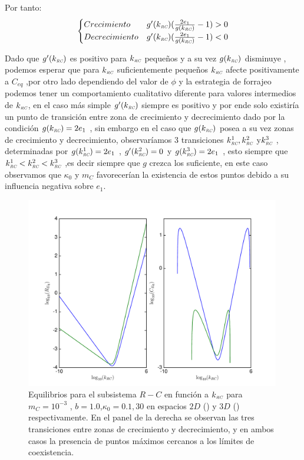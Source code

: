 Por tanto:
\begin{equation}
  \begin{cases}
    Crecimiento &  g'(k_{\textit{\tiny RC}}) ( \frac{2e_1}{g(k_{\textit{\tiny RC}})} - 1) > 0 \\
    Decrecimiento &  g'(k_{\textit{\tiny RC}}) ( \frac{2e_1}{g(k_{\textit{\tiny RC}})} - 1) < 0
    \end{cases}
\end{equation}

Dado que $g'(k_{\textit{\tiny RC}})$ es positivo para $k_\RC$ peque\~nos y a su vez $g(k_{\textit{\tiny RC}})$ disminuye , podemos esperar que para $k_\RC$ suficientemente peque\~nos $k_\RC$ afecte positivamente a $C_{eq}$ ,por otro lado dependiendo del valor de $\phi$ y la estrategia de forrajeo podemos tener un comportamiento cualitativo diferente para valores intermedios de $k_\RC$, en el caso m\'as simple $g'(k_{\textit{\tiny RC}})$ siempre es positivo y por ende solo existir\'ia un punto de transici\'on entre zona de crecimiento y decrecimiento dado por la condici\'on $g(k_{\textit{\tiny RC}}) = 2e_1$ , sin embargo en el caso que $g(k_{\textit{\tiny RC}})$ posea a su vez zonas de crecimiento y decrecimiento, observar\'iamos 3 transiciones $k_{\textit{\tiny RC}}^1 , k_{\textit{\tiny RC}}^2$ y$k_{\textit{\tiny RC}}^3$ , determinadas por $g(k_{\textit{\tiny RC}}^1) = 2e_1$ , $g'(k_{\textit{\tiny RC}}^2) =0$ y $g(k_{\textit{\tiny RC}}^3) = 2e_1$ , esto siempre que $k_{\textit{\tiny RC}}^1 < k_{\textit{\tiny RC}} ^2 < k_{\textit{\tiny RC}}^3$ ,es decir siempre que $g$ crezca los suficiente, en este caso observamos que $\kappa_0$ y $m_C$ favorecer\'ian la existencia de estos puntos debido a su influencia negativa sobre $e_1$.


\begin{figure}
  \centering
  \includegraphics[width = 0.99\textwidth]{./Plots/RCeqKRC.pdf}
  \caption[Equilibrio $R-C$vs$k_\RC$]{Equilibrios para el subsistema $R-C$ en funci\'on a $k_\RC$ para $m_C = 10^{-3}$ , $b = 1.0 $,$\kappa_0 = 0.1 , 30$  en espacios $2D$ ({\hwplotG}) y $3D$ ({\hwplotB}) respectivamente. En el panel de la derecha se observan las tres transiciones entre zonas de crecimiento y decrecimiento, y en ambos casos la presencia de puntos m\'aximos cercanos a los l\'imites de coexistencia.}
  \label{fig:EqRCkRC}
\end{figure}

